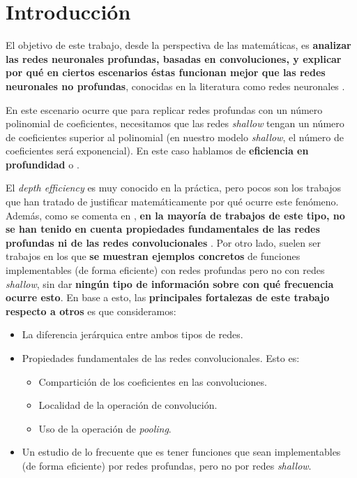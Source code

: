 \chapter{Introducción}\label{ch:introduccion}

El objetivo de este trabajo, desde la perspectiva de las matemáticas, es \textbf{analizar las redes neuronales profundas, basadas en convoluciones, y explicar por qué en ciertos escenarios éstas funcionan mejor que las redes neuronales no profundas}, conocidas en la literatura como redes neuronales .

En este escenario ocurre que para replicar redes profundas con un número polinomial de coeficientes, necesitamos que las redes \textit{shallow} tengan un número de coeficientes superior al polinomial (en nuestro modelo \textit{shallow}, el número de coeficientes será exponencial). En este caso hablamos de \textbf{eficiencia en profundidad} o \textbf{}.

El \textit{depth efficiency} es muy conocido en la práctica, pero pocos son los trabajos que han tratado de justificar matemáticamente por qué ocurre este fenómeno. Además, como se comenta en \cite{matematicas:principal}, \textbf{en la mayoría de trabajos de este tipo, no se han tenido en cuenta propiedades fundamentales de las redes profundas ni de las redes convolucionales} \cite{matematicas:paper_depth_malo_01} \cite{matematicas:paper_depth_malo_02} \cite{matematicas:paper_depth_malo_03}. Por otro lado, suelen ser trabajos en los que \textbf{se muestran ejemplos concretos} de funciones implementables (de forma eficiente) con redes profundas pero no con redes \textit{shallow}, sin dar \textbf{ningún tipo de información sobre con qué frecuencia ocurre esto}. En base a esto, las \textbf{principales fortalezas de este trabajo respecto a otros} es que consideramos:

\begin{itemize}
	\item La diferencia jerárquica entre ambos tipos de redes.
	\item Propiedades fundamentales de las redes convolucionales. Esto es:
	      \begin{itemize}
		      \item Compartición de los coeficientes en las convoluciones.
		      \item Localidad de la operación de convolución.
		      \item Uso de la operación de \textit{pooling}.
	      \end{itemize}
	\item Un estudio de lo frecuente que es tener funciones que sean implementables (de forma eficiente) por redes profundas, pero no por redes \textit{shallow}.
\end{itemize}

